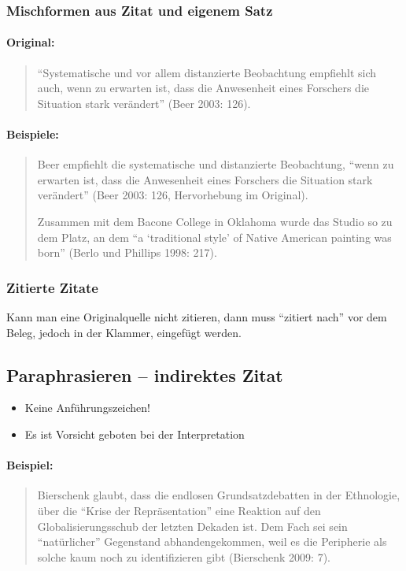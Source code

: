 \documentclass[ 12pt,
                titlepage,
                parskip=half,
                version=first,
                bibliography=totocnumbered,
                final,
                listof=totoc]{scrartcl}
\begin{document}
\subsubsection{Mischformen aus Zitat und eigenem Satz}

\paragraph{Original:}
\begin{quote}
\enquote{Systematische und vor allem distanzierte Beobachtung empfiehlt sich
auch, wenn zu erwarten ist, dass die Anwesenheit eines Forschers die Situation
stark verändert} (Beer 2003: 126).
\end{quote}

\paragraph{Beispiele:}
\begin{quote}
Beer empfiehlt die systematische und distanzierte Beobachtung, \enquote{wenn zu
erwarten ist, dass die Anwesenheit eines Forschers die Situation stark
verändert} (Beer 2003: 126, Hervorhebung im Original).

Zusammen mit dem Bacone College in Oklahoma wurde das Studio so zu dem Platz, an
dem \enquote{a \enquote{traditional style} of Native American painting was born}
(Berlo und Phillips 1998: 217).
\end{quote}

\subsubsection{Zitierte Zitate}

Kann man eine Originalquelle nicht zitieren, dann muss \enquote{zitiert nach}
vor dem Beleg, jedoch in der Klammer, eingefügt werden.

\subsection{Paraphrasieren -- indirektes Zitat}

\begin{itemize}
    \item Keine Anführungszeichen!
    \item Es ist Vorsicht geboten bei der Interpretation
\end{itemize}

\paragraph{Beispiel:}
\begin{quote}
Bierschenk glaubt, dass die endlosen Grundsatzdebatten in der Ethnologie, über
die \enquote{Krise der Repräsentation} eine Reaktion auf den
Globalisierungsschub der letzten Dekaden ist. Dem Fach sei sein
\enquote{natürlicher} Gegenstand abhandengekommen, weil es die Peripherie als
solche kaum noch zu identifizieren gibt (Bierschenk 2009: 7).
\end{quote}
\end{document}
